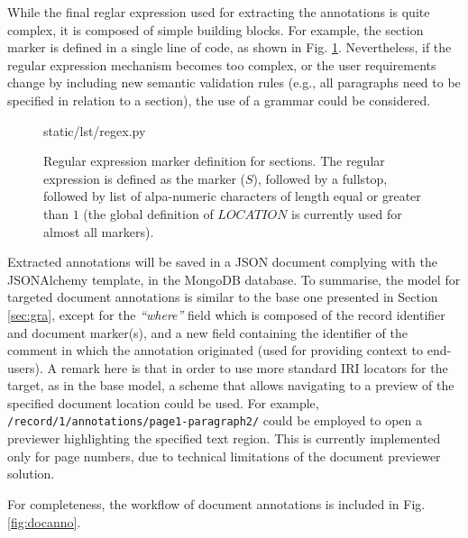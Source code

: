While the final reglar expression used for extracting the annotations is quite
complex, it is composed of simple building blocks. For example, the section
marker is defined in a single line of code, as shown in Fig. \ref{lst:regex}.
Nevertheless, if the regular expression mechanism becomes too complex, or the
user requirements change by including new semantic validation rules (e.g., all
paragraphs need to be specified in relation to a section), the use of a
grammar could be considered.

\begin{figure}[!ht]
  
    {static/lst/regex.py}
    \caption[Regular expression marker definition for sections]
            {Regular expression marker definition for sections. The regular
             expression is defined as the marker ($S$), followed by a fullstop,
             followed by list of alpa-numeric characters of length equal or
             greater than $1$ (the global definition of $LOCATION$ is currently
             used for almost all markers).}
    \label{lst:regex}
\end{figure}

Extracted annotations will be saved in a JSON document complying with the
JSONAlchemy template, in the MongoDB database. To summarise, the model for
targeted document annotations is similar to the base one presented in Section
\ref{sec:gra}, except for the \textit{``where''} field which is composed of the
record identifier and document marker(s), and a new field containing the
identifier of the comment in which the annotation originated (used for
providing context to end-users). A remark here is that in order to use more
standard IRI locators for the target, as in the base model, a scheme that
allows navigating to a preview of the specified document location could be
used.  For example, \texttt{/record/1/annotations/page1-paragraph2/} could be
employed to open a previewer highlighting the specified text region. This is
currently implemented only for page numbers, due to technical limitations of
the document previewer solution.

For completeness, the workflow of document annotations is included in Fig.
\ref{fig:docanno}.

